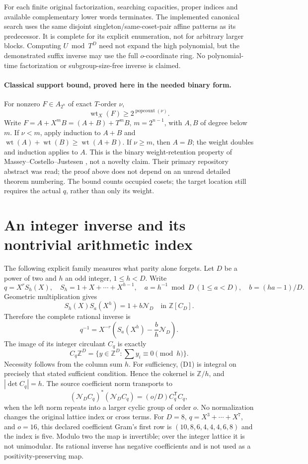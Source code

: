 For each finite original factorization, searching capacities, proper indices
and available complementary lower words terminates. The implemented canonical
search uses the same disjoint singleton/same-coset-pair affine patterns as its
predecessor. It is complete for its explicit enumeration, not for arbitrary
larger blocks. Computing $U\bmod T^D$ need not expand the high polynomial, but
the demonstrated suffix inverse may use the full $o$-coordinate ring. No
polynomial-time factorization or subgroup-size-free inverse is claimed.

\paragraph{Classical support bound, proved here in the needed binary form.}
For nonzero $F\in A_{2^n}$ of exact $T$-order $\nu$,
\[
 \operatorname{wt}_X(F)\ge2^{\operatorname{popcount}(\nu)}.\tag{C4}
\]
Write $F=A+X^mB=(A+B)+T^mB$, $m=2^{n-1}$, with $A,B$ of degree below $m$.
If $\nu<m$, apply induction to $A+B$ and
$\operatorname{wt}(A)+\operatorname{wt}(B)\ge\operatorname{wt}(A+B)$.
If $\nu\ge m$, then $A=B$; the weight doubles and induction applies to $A$.
This is the binary weight-retention property of Massey--Costello--Justesen
\cite{MCJ}, not a novelty claim. Their primary repository abstract was read;
the proof above does not depend on an unread detailed theorem numbering.
The bound counts occupied cosets; the target location still requires the
actual $q$, rather than only its weight.

\section{An integer inverse and its nontrivial arithmetic index}
The following explicit family measures what parity alone forgets. Let $D$ be
a power of two and $h$ an odd integer, $1\le h<D$. Write
\[
 q=X^rS_h(X),\quad S_h=1+X+\cdots+X^{h-1},\quad
 a=h^{-1}\bmod D\ (1\le a<D),\quad b=(ha-1)/D.
\]
Geometric multiplication gives
\[
 S_h(X)S_a(X^h)=1+b\mathcal N_D\quad\text{in }\mathbb Z[C_D].
\]
Therefore the complete rational inverse is
\[
 \boxed{q^{-1}=X^{-r}\left(S_a(X^h)-\frac bh\mathcal N_D\right).} \tag{D1}
\]
The image of its integer circulant $C_q$ is exactly
\[
 \boxed{C_q\mathbb Z^D
 =\{y\in\mathbb Z^D:\textstyle\sum y_i\equiv0\pmod h\}.} \tag{D2}
\]
Necessity follows from the column sum $h$. For sufficiency, (D1) is integral
on precisely that stated sufficient condition. Hence the cokernel is
$\mathbb Z/h$, and $|\det C_q|=h$. The source coefficient norm transports to
\[
 \boxed{(\mathcal N_D C_q)^*(\mathcal N_D C_q)
 =(o/D)C_q^{\mathsf T}C_q,}                               \tag{D3}
\]
when the left norm repeats into a larger cyclic group of order $o$.
No normalization changes the original lattice index or cross terms.
For $D=8$, $q=X^3+\cdots+X^7$, and $o=16$, this declared coefficient Gram's first row is
$(10,8,6,4,4,4,6,8)$ and the index is five. Modulo two the map is invertible;
over the integer lattice it is not unimodular. Its rational inverse has
negative coefficients and is not used as a positivity-preserving map.

